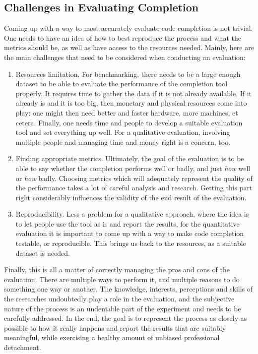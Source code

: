 \documentclass[sigplan,screen]{acmart}
\begin{document}
\subsection{Challenges in Evaluating Completion}
Coming up with a way to most accurately evaluate code completion is not trivial. One needs to have an idea of how to best reproduce the process and what the metrics should be, as well as have access to the resources needed. Mainly, here are the main challenges that need to be considered when conducting an evaluation:
\begin{enumerate}
    \item Resources limitation. For benchmarking, there needs to be a large enough dataset to be able to evaluate the performance of the completion tool properly. It requires time to gather the data if it is not already available. If it already is and it is too big, then monetary and physical resources come into play: one might then need better and faster hardware, more machines, et cetera. Finally, one needs time and people to develop a suitable evaluation tool and set everything up well. For a qualitative evaluation, involving multiple people and managing time and money right is a concern, too. 
    \item Finding appropriate metrics. Ultimately, the goal of the evaluation is to be able to say whether the completion performs well or badly, and just \textit{how} well or \textit{how} badly. Choosing metrics which will adequately represent the quality of the performance takes a lot of careful analysis and research. Getting this part right considerably influences the validity of the end result of the evaluation.
    \item Reproducibility. Less a problem for a qualitative approach, where the idea is to let people use the tool as is and report the results, for the quantitative evaluation it is important to come up with a way to make code completion testable, or reproducible. This brings us back to the resources, as a suitable dataset is needed.
\end{enumerate}

Finally, this is all a matter of correctly managing the pros and cons of the evaluation. There are multiple ways to perform it, and multiple reasons to do something one way or another. The knowledge, interests, perceptions and skills of the researches undoubtedly play a role in the evaluation, and the subjective nature of the process is an undeniable part of the experiment and needs to be carefully addressed. In the end, the goal is to represent the process as closely as possible to how it really happens and report the results that are suitably meaningful, while exercising a healthy amount of unbiased professional detachment.
\end{document}
